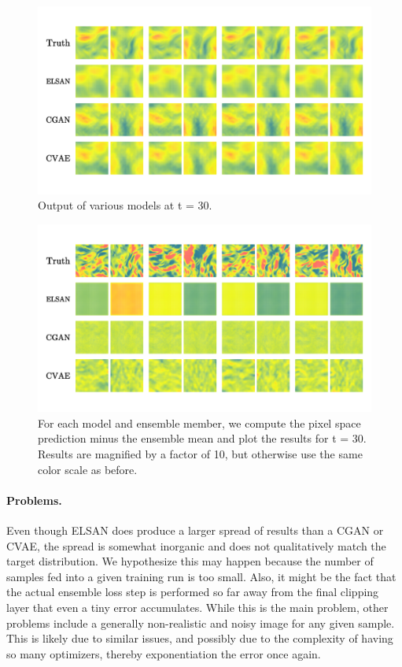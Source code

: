 \documentclass{article}
\begin{document}
\begin{figure}
    \centering
    \includegraphics[width=\textwidth]{t=30}
    \caption{Output of various models at t = 30.}
    \label{t=30}
\end{figure}

\begin{figure}
    \centering
    \includegraphics[width=\textwidth]{t=30diff}
    \caption{For each model and ensemble member, we compute the pixel space prediction minus the ensemble mean and plot the results for t = 30. Results are magnified by a factor of 10, but otherwise use the same color scale as before.}
    \label{t=30diff}
\end{figure}

\paragraph{Problems.}
Even though ELSAN does produce a larger spread of results than a CGAN or CVAE, the spread is somewhat inorganic and does not qualitatively match the target distribution. We hypothesize this may happen because the number of samples fed into a given training run is too small. Also, it might be the fact that the actual ensemble loss step is performed so far away from the final clipping layer that even a tiny error accumulates. While this is the main problem, other problems include a generally non-realistic and noisy image for any given sample. This is likely due to similar issues, and possibly due to the complexity of having so many optimizers, thereby exponentiation the error once again.
\end{document}
